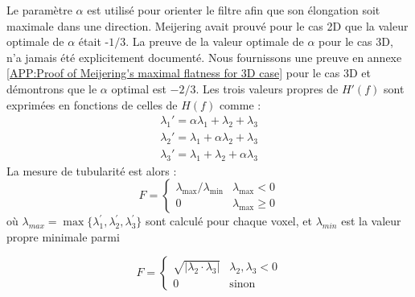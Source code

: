 Le paramètre $\alpha$ est utilisé pour orienter le filtre afin que son élongation soit maximale dans une direction. Meijering avait prouvé pour le cas 2D que la valeur optimale de $\alpha$ était -$1/3$. La preuve de la valeur optimale de $\alpha$ pour le cas 3D, n'a jamais été explicitement documenté. Nous fournissons une preuve en annexe \ref{APP:Proof of Meijering's maximal flatness for 3D case} pour le cas 3D et démontrons que le $\alpha$ optimal est $-2/3$. Les trois valeurs propres de $H'(f)$ sont exprimées en fonctions de celles de $H(f)$ comme :
\begin{equation}
  \begin{aligned}
    \nonumber \lambda_1' = \alpha\lambda_1 + \lambda_2 + \lambda_3 \\
    \nonumber \lambda_2' = \lambda_1 + \alpha\lambda_2 + \lambda_3 \\
    \nonumber \lambda_3' = \lambda_1 + \lambda_2 + \alpha\lambda_3
  \end{aligned}
\end{equation}
La mesure de tubularité est alors :
\begin{equation}
\nonumber 
  F =
  \left\{
  \begin{array}{lr}
    \lambda_{\max} / \lambda_{\min}   &  \lambda_{\max} < 0\\
      0 &  \lambda_{\max} \geqslant 0
  \end{array}
  \right.
\end{equation}
où $\lambda_{max} = \max\{\lambda_{1}^{'},\lambda_{2}^{'},\lambda_{3}^{'}\}$ sont calculé pour chaque voxel, et $\lambda_{min}$ est la valeur propre minimale parmi 


\begin{equation}
\nonumber
    F =
    \left\{
    \begin{array}{lr}
    
    \sqrt{|\lambda_2 \cdot \lambda_3|}   & \lambda_2, \lambda_3 < 0 \\
    0     & \textrm{sinon}
    \end{array}
    \right.
\end{equation}

